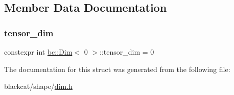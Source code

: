 \subsection{Member Data Documentation}
\mbox{\label{structbc_1_1Dim_3_010_01_4_a3896dc5bb858574ede513c58afe1a7ce}} 
\subsubsection{\texorpdfstring{tensor\+\_\+dim}{tensor\_dim}}
{\footnotesize\ttfamily constexpr int \hyperlink{structbc_1_1Dim}{bc\+::\+Dim}$<$ 0 $>$\+::tensor\+\_\+dim = 0\hspace{0.3cm}{\ttfamily [static]}}



The documentation for this struct was generated from the following file\+:\begin{DoxyCompactItemize}
\item 
blackcat/shape/\hyperlink{dim_8h}{dim.\+h}\end{DoxyCompactItemize}
